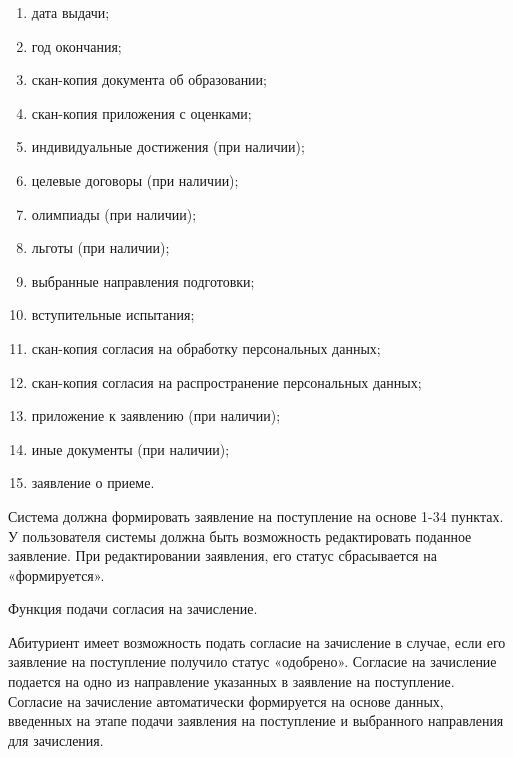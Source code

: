 \begin{enumerate}
  \item дата выдачи;
  
  \item год окончания;
  
  \item скан-копия документа об образовании;
  
  \item скан-копия приложения с оценками;
  
  \item индивидуальные достижения (при наличии);
  
  \item целевые договоры (при наличии);
  
  \item олимпиады (при наличии);
  
  \item льготы (при наличии);
  
  \item выбранные направления подготовки;
  
  \item вступительные испытания;
  
  \item скан-копия согласия на обработку персональных данных;
  
  \item скан-копия согласия на распространение персональных данных;
  
  \item приложение к заявлению (при наличии);   
  
  \item иные документы (при наличии);
  
  \item заявление о приеме.
\end{enumerate}

Система должна формировать заявление на поступление на основе 1-34 пунктах. У пользователя системы должна быть возможность редактировать поданное заявление. При редактировании заявления, его статус сбрасывается на «формируется».

Функция подачи согласия на зачисление.

Абитуриент имеет возможность подать согласие на зачисление в случае, если его заявление на поступление получило статус «одобрено». Согласие на зачисление подается на одно из направление указанных в заявление на поступление. Согласие на зачисление автоматически формируется на основе данных, введенных на этапе подачи заявления на поступление и выбранного направления для зачисления.

